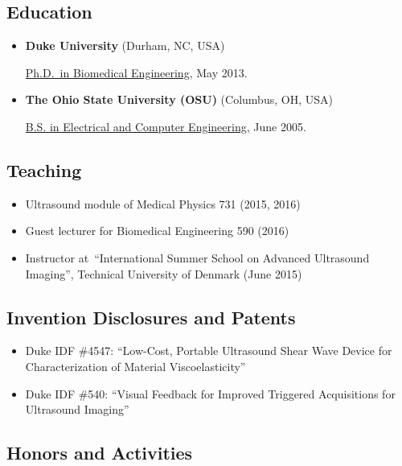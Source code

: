 \documentclass[]{article}
\begin{document}
\subsection{Education}\label{education}

\begin{itemize}
\item
  \textbf{Duke University} (Durham, NC, USA)

  \href{http://bme.duke.edu/grad}{Ph.D.~in Biomedical Engineering}, May
  2013.
\item
  \textbf{The Ohio State University (OSU)} (Columbus, OH, USA)

  \href{http://ece.osu.edu/futurestudents/undergrad}{B.S. in Electrical
  and Computer Engineering}, June 2005.
\end{itemize}

\subsection{Teaching}\label{teaching}

\begin{itemize}
\itemsep1pt\parskip0pt
\item
  Ultrasound module of Medical Physics 731 (2015, 2016)
\item
  Guest lecturer for Biomedical Engineering 590 (2016)
\item
  Instructor at~``International Summer School on Advanced Ultrasound
  Imaging'', Technical University of Denmark (June 2015)
\end{itemize}

\subsection{Invention Disclosures and
Patents}\label{invention-disclosures-and-patents}

\begin{itemize}
\itemsep1pt\parskip0pt
\item
  Duke IDF \#4547: ``Low-Cost, Portable Ultrasound Shear Wave Device for
  Characterization of Material Viscoelasticity''
\item
  Duke IDF \#540: ``Visual Feedback for Improved Triggered Acquisitions
  for Ultrasound Imaging''
\end{itemize}

\subsection{Honors and Activities}\label{honors-and-activities}
\end{document}
